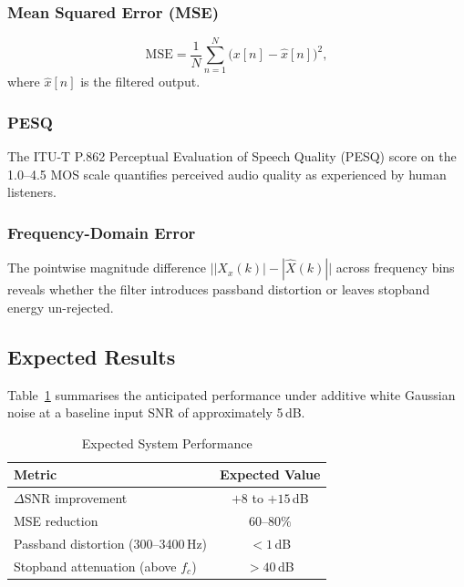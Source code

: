 \documentclass[conference]{IEEEtran}
\begin{document}
\subsubsection{Mean Squared Error (MSE)}
\begin{equation}
  \mathrm{MSE} = \frac{1}{N}\sum_{n=1}^{N}\bigl(x[n] - \hat{x}[n]\bigr)^2,
  \label{eq:mse}
\end{equation}
where $\hat{x}[n]$ is the filtered output.

\subsubsection{PESQ}
The ITU-T P.862 Perceptual Evaluation of Speech Quality (PESQ) score
\cite{itu2001} on the 1.0--4.5 MOS scale quantifies perceived audio quality
as experienced by human listeners.

\subsubsection{Frequency-Domain Error}
The pointwise magnitude difference
$\bigl||X_x(k)| - |\hat{X}(k)|\bigr|$ across frequency bins reveals whether
the filter introduces passband distortion or leaves stopband energy un-rejected.

\subsection{Expected Results}

Table~\ref{tab:results} summarises the anticipated performance under additive
white Gaussian noise at a baseline input SNR of approximately 5\,dB.

\begin{table}[htbp]
\caption{Expected System Performance}
\label{tab:results}
\centering
\begin{tabular}{lc}
\toprule
\textbf{Metric} & \textbf{Expected Value} \\
\midrule
$\Delta$SNR improvement          & $+8$ to $+15$\,dB \\
MSE reduction                     & $60$--$80\%$ \\
Passband distortion (300--3400\,Hz) & $< 1$\,dB \\
Stopband attenuation (above $f_c$) & $> 40$\,dB \\
\bottomrule
\end{tabular}
\end{table}

\end{document}
